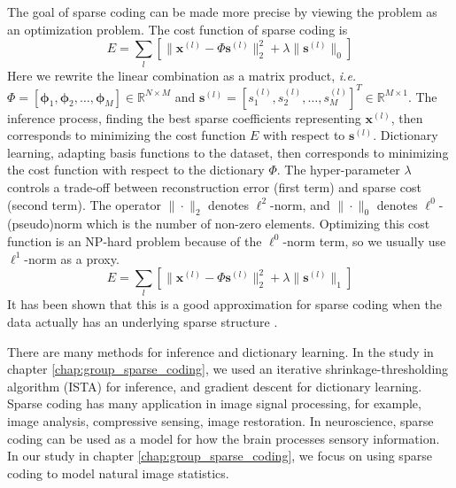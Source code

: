The goal of sparse coding can be made more precise by viewing the problem as an optimization problem. The cost function of sparse coding is
\begin{equation}
\label{eq:sccost_l0}
E = \sum_{l} \left[
	\|\boldsymbol{x}^{(l)} - \Phi\boldsymbol{s}^{(l)}\|_2^2 +
	\lambda \|\boldsymbol{s}^{(l)}\|_0
\right]
\end{equation}
Here we rewrite the linear combination as a matrix product, \textit{i.e.} $\Phi = [\boldsymbol{\phi}_1, \boldsymbol{\phi}_2, \ldots, \boldsymbol{\phi}_M] \in \mathbb{R}^{N \times M}$ and $\boldsymbol{s}^{(l)} = [s_1^{(l)}, s_2^{(l)}, \ldots, s_M^{(l)}]^T \in \mathbb{R}^{M \times 1}$. The inference process, finding the best sparse coefficients representing $\boldsymbol{x}^{(l)}$, then corresponds to minimizing the cost function $E$ with respect to $\boldsymbol{s}^{(l)}$. Dictionary learning, adapting basis functions to the dataset, then corresponds to minimizing the cost function with respect to the dictionary $\Phi$. The hyper-parameter $\lambda$ controls a trade-off between reconstruction error (first term) and sparse cost (second term). The operator $\|\cdot\|_2$ denotes $\ell^2$-norm, and $\|\cdot\|_0$ denotes $\ell^0$-(pseudo)norm which is the number of non-zero elements. Optimizing this cost function is an NP-hard problem because of the $\ell^0$-norm term, so we usually use $\ell^1$-norm as a proxy.
\begin{equation}
\label{eq:sccost}
E = \sum_{l} \left[
	\|\boldsymbol{x}^{(l)} - \Phi\boldsymbol{s}^{(l)}\|_2^2 +
	\lambda \|\boldsymbol{s}^{(l)}\|_1
\right]
\end{equation}
It has been shown that this is a good approximation for sparse coding when the data actually has an underlying sparse structure \cite{dd06}.

There are many methods for inference and dictionary learning. In the study in chapter \ref{chap:group_sparse_coding}, we used an iterative shrinkage-thresholding algorithm (ISTA) for inference, and gradient descent for dictionary learning. Sparse coding has many application in image signal processing, for example, image analysis, compressive sensing, image restoration. In neuroscience, sparse coding can be used as a model for how the brain processes sensory information. In our study in chapter \ref{chap:group_sparse_coding}, we focus on using sparse coding to model natural image statistics.
